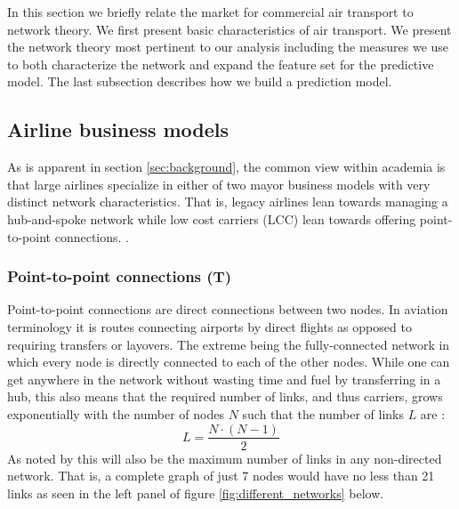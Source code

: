 \label{sec:theory}
In this section we briefly relate the market for commercial air transport to network theory. We first present basic characteristics of air transport. We present the network theory most pertinent to our analysis including the measures we use to both characterize the network and expand the feature set for the predictive model. The last subsection describes how we build a prediction model.

\subsection{Airline business models}
As is apparent in section \ref{sec:background}, the common view within academia is that large airlines specialize in either of two mayor business models with very distinct network characteristics. That is, legacy airlines lean towards managing a hub-and-spoke network while low cost carriers (LCC) lean towards offering point-to-point connections. \citep{daraban2012low,baker2013service,marti2015efficiency}.

\subsubsection{Point-to-point connections (T)}
Point-to-point connections are direct connections between two nodes. In aviation terminology it is routes connecting airports by direct flights as opposed to requiring transfers or layovers. The extreme being the fully-connected network in which every node is directly connected to each of the other nodes. While one can get anywhere in the network without wasting time and fuel by transferring in a hub, this also means that the required number of links, and thus carriers, grows exponentially with the number of nodes $N$ such that the number of links $L$ are \citep{bryan1999hub}:
\begin{equation}
  L=\frac{N\cdot(N-1)}{2}
  \label{eq:max_links}
\end{equation}
As noted by \citet{barabasi2016networks} this will also be the maximum number of links in any non-directed network. That is, a complete graph of just 7 nodes would have no less than 21 links as seen in the left panel of figure \ref{fig:different_networks} below.

